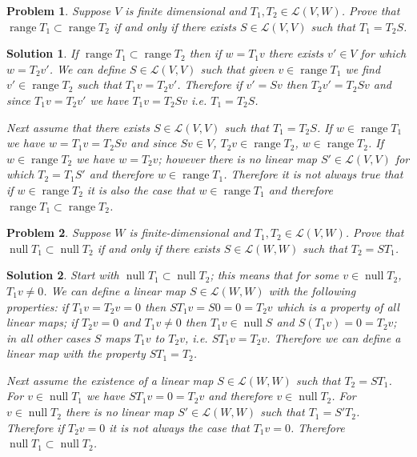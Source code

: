 \documentclass[11pt,a4paper]{scrartcl}
\DeclareMathOperator{\range}{range}
\DeclareMathOperator{\nspace}{null}
\newcommand{\lmap}[2]{\mathcal{L}(#1,#2)}
\theoremstyle{solve}
\newtheorem{problem}{Problem}
\newtheorem*{solution}{Solution}
\begin{document}
\begin{problem}
    Suppose $V$ is finite dimensional and $T_1,T_2 \in \lmap{V}{W}$. Prove that $\range T_1 \subset \range T_2$ if and only if there exists $S \in \lmap{V}{V}$ such that $T_1=T_2 S$.
\end{problem}
\begin{solution}
    If $\range T_1 \subset \range T_2$ then if $w=T_1v$
    there exists $v'\in V$ for which $w=T_2 v'$. We can define
    $S\in \lmap{V}{V}$ such that given $v \in \range T_1$
    we find $v' \in \range T_2$ such that $T_1v=T_2v'$. Therefore if $v'=Sv$ then $T_2v'=T_2Sv$ and since $T_1v=T_2v'$ we have $T_1v=T_2Sv$ i.e. $T_1=T_2S$.

\noindent Next assume that there exists $S \in \lmap{V}{V}$ such that $T_1=T_2 S$. If $w \in \range T_1$ we have
$w=T_1v=T_2Sv$ and since $Sv \in V$, $T_2v \in \range T_2$,
$w \in \range T_2$. If $w \in \range T_2$ we have $w=T_2v$;
however there is no linear map $S'\in \lmap{V}{V}$ for which $T_2=T_1S'$ and therefore $w \in \range T_1$. Therefore it is not always true that if $w \in \range T_2$ it is also the case that $w \in \range T_1$ and therefore $\range T_1 \subset \range T_2$.
\end{solution}

\begin{problem}
    Suppose $W$ is finite-dimensional and $T_1,T_2 \in \lmap{V}{W}$. Prove that $\nspace T_1 \subset \nspace T_2$ if and only if there exists $S \in \lmap{W}{W}$ such that $T_2=ST_1$.
\end{problem}
\begin{solution}
    Start with $\nspace T_1 \subset \nspace T_2$; this means that for some $v \in \nspace T_2$, $T_1v \neq 0$. We can define a linear map $S\in \lmap{W}{W}$  with the following properties: if $T_1v=T_2v=0$ then $ST_1v=S0=0=T_2v$ which is a property of all linear maps; if $T_2v=0$ and $T_1v\neq 0$ then $T_1v \in \nspace S$ and
    $S(T_1v)=0=T_2v$; in all other cases $S$ maps $T_1v$ to $T_2v$, i.e. $ST_1v=T_2v$. Therefore we can define a linear map with the property $ST_1=T_2$.

    \noindent Next assume the existence of a linear map
    $S \in \lmap{W}{W}$ such that $T_2=ST_1$. For 
    $v \in \nspace T_1$ we have $ST_1v=0=T_2v$ and therefore
    $v \in \nspace T_2$. For $v \in \nspace T_2$ there is no linear map $S' \in \lmap{W}{W}$ such that $T_1=S'T_2$.
    Therefore if $T_2v=0$ it is not always the case that
    $T_1v=0$. Therefore $\nspace T_1 \subset \nspace T_2$.
\end{solution}
\end{document}
